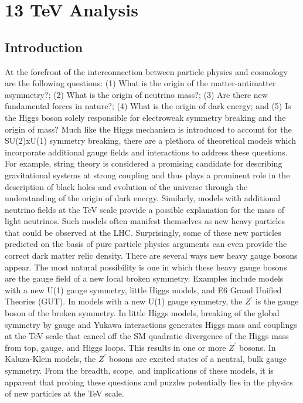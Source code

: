 \chapter{13 TeV Analysis}
\label{mathchapter}

\section{Introduction}\label{sec:intro}

At the forefront of the interconnection between particle physics and cosmology are the following questions: (1) What is the origin of the matter-antimatter 
asymmetry?; (2) What is the origin of neutrino mass?; (3) Are there new fundamental forces in nature?; (4) What is the origin of dark energy; and (5) Is the Higgs 
boson solely responsible for electroweak symmetry breaking and the origin of mass? Much like the Higgs mechanism is introduced to account for the SU(2)xU(1) 
symmetry breaking, there are a plethora of theoretical models which incorporate additional gauge fields and interactions to address these questions. For example, 
string theory is considered a promising candidate for describing gravitational systems at strong coupling and thus plays a prominent role in the description of 
black holes and evolution of the universe through the understanding of the origin of dark energy. Similarly, models with additional neutrino fields at the TeV 
scale provide a possible explanation for the mass of light neutrinos. Such models often manifest themselves as new heavy particles that could be observed at the 
LHC. Surprisingly, some of these new particles predicted on the basis of pure particle physics arguments can even provide the correct dark matter relic density. 
There are several ways new heavy gauge bosons appear. The most natural possibility is one in which these heavy gauge bosons are the gauge field of a new 
local broken symmetry. Examples include models with a new U(1) gauge symmetry, little Higgs models, and E6 Grand Unified Theories (GUT). 
In models with a new U(1) gauge symmetry, the $Z^\prime$ is the gauge boson of the broken symmetry. In
little Higgs models, breaking of the global symmetry by gauge and Yukawa interactions generates Higgs mass and couplings at the TeV scale that cancel off the SM
quadratic divergence of the Higgs mass from top, gauge, and Higgs loops. This results in one or more $Z^\prime$ bosons. In Kaluza-Klein models, the $Z^\prime$
bosons are excited states of a neutral, bulk gauge symmetry.
From the breadth, scope, and implications of these models, it is apparent that probing these questions and puzzles potentially lies in the physics of new
particles at the TeV scale. 

